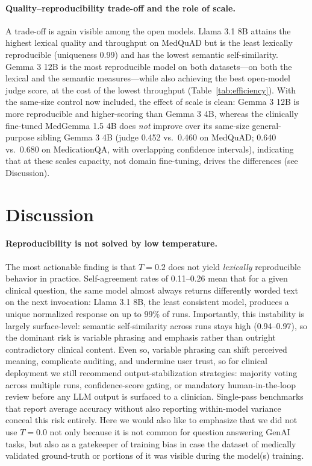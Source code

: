 \documentclass[10pt,letterpaper]{article}
\begin{document}
\paragraph{Quality--reproducibility trade-off and the role of scale.}
A trade-off is again visible among the open models. Llama 3.1 8B attains
the highest lexical quality and throughput on MedQuAD but is the least
lexically reproducible (uniqueness 0.99) and has the lowest semantic
self-similarity. Gemma 3 12B is the most reproducible model on both
datasets---on both the lexical and the semantic measures---while also
achieving the best open-model judge score, at the cost of the lowest
throughput (Table~\ref{tab:efficiency}). With the same-size control now
included, the effect of scale is clean: Gemma 3 12B is more reproducible
and higher-scoring than Gemma 3 4B, whereas the clinically fine-tuned
MedGemma 1.5 4B does \emph{not} improve over its same-size
general-purpose sibling Gemma 3 4B (judge 0.452 vs.\ 0.460 on MedQuAD;
0.640 vs.\ 0.680 on MedicationQA, with overlapping confidence
intervals), indicating that at these scales capacity, not domain
fine-tuning, drives the differences (see Discussion).

\section*{Discussion}
\label{sec:discussion}

\paragraph{Reproducibility is not solved by low temperature.}
The most actionable finding is that $T{=}0.2$ does not yield
\emph{lexically} reproducible behavior in practice.
Self-agreement rates of 0.11--0.26 mean that for a given clinical
question, the same model almost always returns differently worded text
on the next invocation: Llama 3.1 8B, the least consistent model,
produces a unique normalized response on up to 99\% of runs.
Importantly, this instability is largely surface-level: semantic
self-similarity across runs stays high (0.94--0.97), so the dominant
risk is variable phrasing and emphasis rather than outright
contradictory clinical content. Even so, variable phrasing can shift
perceived meaning, complicate auditing, and undermine user trust, so for
clinical deployment we still recommend output-stabilization
strategies: majority voting across multiple runs, confidence-score
gating, or mandatory human-in-the-loop review before any LLM output
is surfaced to a clinician.
Single-pass benchmarks that report average accuracy without also
reporting within-model variance conceal this risk entirely. Here
we would also like to emphasize that we did not use $T{=}0.0$ not
only because it is not common for question answering GenAI tasks,
but also as a gatekeeper of training bias in case the dataset
of medically validated ground-truth or portions of it was visible
during the model(s) training.
\end{document}

